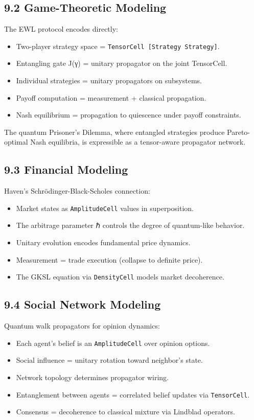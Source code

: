 \documentclass[11pt]{article}
\begin{document}
\subsection{9.2 Game-Theoretic Modeling}
\label{sec:org97f05cd}

The EWL protocol encodes directly:

\begin{itemize}
\item Two-player strategy space = \texttt{TensorCell [Strategy Strategy]}.
\item Entangling gate J(γ) = unitary propagator on the joint TensorCell.
\item Individual strategies = unitary propagators on subsystems.
\item Payoff computation = measurement + classical propagation.
\item Nash equilibrium = propagation to quiescence under payoff constraints.
\end{itemize}

The quantum Prisoner's Dilemma, where entangled strategies produce Pareto-optimal
Nash equilibria, is expressible as a tensor-aware propagator network.
\subsection{9.3 Financial Modeling}
\label{sec:orge089767}

Haven's Schrödinger-Black-Scholes connection:

\begin{itemize}
\item Market states as \texttt{AmplitudeCell} values in superposition.
\item The arbitrage parameter ℏ controls the degree of quantum-like behavior.
\item Unitary evolution encodes fundamental price dynamics.
\item Measurement = trade execution (collapse to definite price).
\item The GKSL equation via \texttt{DensityCell} models market decoherence.
\end{itemize}
\subsection{9.4 Social Network Modeling}
\label{sec:org18816e4}

Quantum walk propagators for opinion dynamics:

\begin{itemize}
\item Each agent's belief is an \texttt{AmplitudeCell} over opinion options.
\item Social influence = unitary rotation toward neighbor's state.
\item Network topology determines propagator wiring.
\item Entanglement between agents = correlated belief updates via \texttt{TensorCell}.
\item Consensus = decoherence to classical mixture via Lindblad operators.
\end{itemize}
\end{document}
